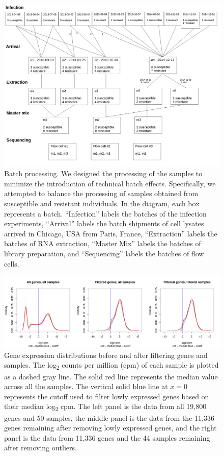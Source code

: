 \documentclass[fleqn,10pt]{wlscirep}
\begin{document}
\begin{figure}[ht]
\centering
\includegraphics[width=\linewidth]{../figure/processing.pdf}
\caption{
Batch processing. We designed the processing of the samples to
minimize the introduction of technical batch effects. Specifically, we
attempted to balance the processing of samples obtained from
susceptible and resistant individuals. In the diagram, each box
represents a batch. “Infection” labels the batches of the infection
experiments, “Arrival” labels the batch shipments of cell lysates
arrived in Chicago, USA from Paris, France, “Extraction” labels the
batches of RNA extraction, “Master Mix” labels the batches of library
preparation, and “Sequencing” labels the batches of flow cells.
}
\label{fig:process}
\end{figure}


\begin{figure}[ht]
\centering
\includegraphics[width=\linewidth]{../figure/gene-exp-distribution.pdf}
\caption{
Gene expression distributions before and after filtering genes and
samples. The log\textsubscript{2} counts per million (cpm) of each
sample is plotted as a dashed gray line. The solid red line represents
the median value across all the samples. The vertical solid blue line
at $x = 0$ represents the cutoff used to filter lowly expressed genes
based on their median log\textsubscript{2} cpm. The left panel is the
data from all 19,800 genes and 50 samples, the middle panel is the
data from the 11,336 genes remaining after removing lowly expressed
genes, and the right panel is the data from 11,336 genes and the 44
samples remaining after removing outliers.
}
\label{fig:gene}
\end{figure}
\end{document}
